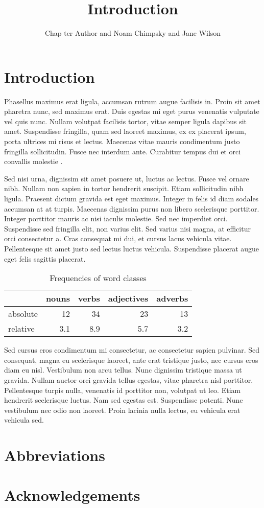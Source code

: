 \documentclass[output=paper]{langscibook}
\title{Introduction}
\author{%
 Chap ter Author\affiliation{University of Eden} and
 Noam Chimpsky\affiliation{University of Pluto} and
 Jane Wilson\affiliation{National Institute for Language}
}
\begin{document}
\maketitle
\section{Introduction}
Phasellus maximus erat ligula, accumsan rutrum augue facilisis in. Proin sit amet pharetra nunc, sed maximus erat. Duis egestas mi eget purus venenatis vulputate vel quis nunc. Nullam volutpat facilisis tortor, vitae semper ligula dapibus sit amet. Suspendisse fringilla, quam sed laoreet maximus, ex ex placerat ipsum, porta ultrices mi risus et lectus. Maecenas vitae mauris condimentum justo fringilla sollicitudin. Fusce nec interdum ante. Curabitur tempus dui et orci convallis molestie \citep{Chomsky1957}.



Sed nisi urna, dignissim sit amet posuere ut, luctus ac lectus. Fusce vel ornare nibh. Nullam non sapien in tortor hendrerit suscipit. Etiam sollicitudin nibh ligula. Praesent dictum gravida est eget maximus. Integer in felis id diam sodales accumsan at at turpis. Maecenas dignissim purus non libero scelerisque porttitor. Integer porttitor mauris ac nisi iaculis molestie. Sed nec imperdiet orci. Suspendisse sed fringilla elit, non varius elit. Sed varius nisi magna, at efficitur orci consectetur a. Cras consequat mi dui, et cursus lacus vehicula vitae. Pellentesque sit amet justo sed lectus luctus vehicula. Suspendisse placerat augue eget felis sagittis placerat.


\begin{table}
\caption{Frequencies of word classes}
\label{tab:1:frequencies}
 \begin{tabular}{lrrrr}
            & nouns & verbs & adjectives & adverbs\\
  \midrule
  absolute  &   12 &    34  &    23     & 13\\
  relative  &   3.1 &   8.9 &    5.7    & 3.2\\
 \end{tabular}
\end{table}


Sed cursus eros condimentum mi consectetur, ac consectetur sapien pulvinar. Sed consequat, magna eu scelerisque laoreet, ante erat tristique justo, nec cursus eros diam eu nisl. Vestibulum non arcu tellus. Nunc dignissim tristique massa ut gravida. Nullam auctor orci gravida tellus egestas, vitae pharetra nisl porttitor. Pellentesque turpis nulla, venenatis id porttitor non, volutpat ut leo. Etiam hendrerit scelerisque luctus. Nam sed egestas est. Suspendisse potenti. Nunc vestibulum nec odio non laoreet. Proin lacinia nulla lectus, eu vehicula erat vehicula sed.

\section*{Abbreviations}
\section*{Acknowledgements}

\sloppy
\printbibliography[heading=subbibliography,notkeyword=this]
\end{document}
